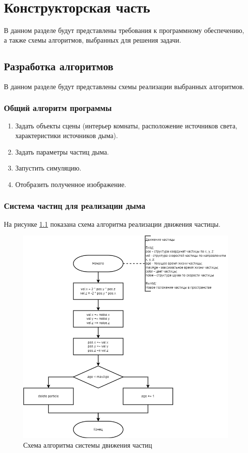 \chapter{Конструкторская часть}

В данном разделе будут представлены требования к программному обеспечению, а также схемы алгоритмов, выбранных для решения задачи.

\section{Разработка алгоритмов}
В данном разделе будут представлены схемы реализации выбранных алгоритмов. 
\subsection{Общий алгоритм программы}
\begin{enumerate}
	\item Задать объекты сцены (интерьер комнаты, расположение источников света, характеристики источников дыма).
	\item Задать параметры частиц дыма.
	\item Запустить симуляцию.
	\item Отобразить полученное изображение.
\end{enumerate}

\subsection{Система частиц для реализации дыма}

На рисунке \ref{fig:particlemovesystem} показана схема алгоритма реализации движения частицы.

\begin{figure}[H]
	\centering
	\includegraphics[width=1\linewidth]{inc/img/particle_move}
	\caption[]{Схема алгоритма системы движения частиц}
	\label{fig:particlemovesystem}
\end{figure}



